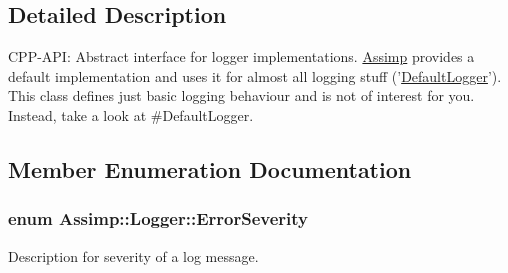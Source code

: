 \subsection{Detailed Description}
C\-P\-P-\/\-A\-P\-I\-: Abstract interface for logger implementations. \hyperlink{namespace_assimp}{Assimp} provides a default implementation and uses it for almost all logging stuff ('\hyperlink{class_assimp_1_1_default_logger}{Default\-Logger}'). This class defines just basic logging behaviour and is not of interest for you. Instead, take a look at \#\-Default\-Logger. 

\subsection{Member Enumeration Documentation}
\hypertarget{class_assimp_1_1_logger_acd0b52a87d6fc11e957ed2c6e2ad75b6}{
\subsubsection[{Error\-Severity}]{\setlength{\rightskip}{0pt plus 5cm}enum {\bf Assimp\-::\-Logger\-::\-Error\-Severity}}}\label{class_assimp_1_1_logger_acd0b52a87d6fc11e957ed2c6e2ad75b6}


Description for severity of a log message. 

